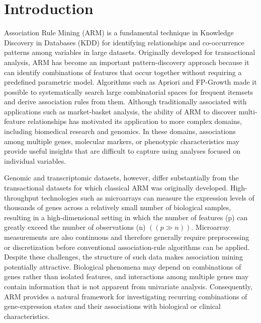 \documentclass[twocolumn]{article}
\begin{document}
\section{Introduction}
Association Rule Mining (ARM) is a fundamental technique in Knowledge Discovery in Databases (KDD) for identifying relationships and co-occurrence patterns among variables in large datasets. Originally developed for transactional analysis, ARM has become an important pattern-discovery approach because it can identify combinations of features that occur together without requiring a predefined parametric model. Algorithms such as Apriori and FP-Growth made it possible to systematically search large combinatorial spaces for frequent itemsets and derive association rules from them. Although traditionally associated with applications such as market-basket analysis, the ability of ARM to discover multi-feature relationships has motivated its application to more complex domains, including biomedical research and genomics. In these domains, associations among multiple genes, molecular markers, or phenotypic characteristics may provide useful insights that are difficult to capture using analyses focused on individual variables.

Genomic and transcriptomic datasets, however, differ substantially from the transactional datasets for which classical ARM was originally developed. High-throughput technologies such as microarrays can measure the expression levels of thousands of genes across a relatively small number of biological samples, resulting in a high-dimensional setting in which the number of features (p) can greatly exceed the number of observations (n) $((p \gg n))$. Microarray measurements are also continuous and therefore generally require preprocessing or discretization before conventional association-rule algorithms can be applied. Despite these challenges, the structure of such data makes association mining potentially attractive. Biological phenomena may depend on combinations of genes rather than isolated features, and interactions among multiple genes may contain information that is not apparent from univariate analysis. Consequently, ARM provides a natural framework for investigating recurring combinations of gene-expression states and their associations with biological or clinical characteristics.
\end{document}
